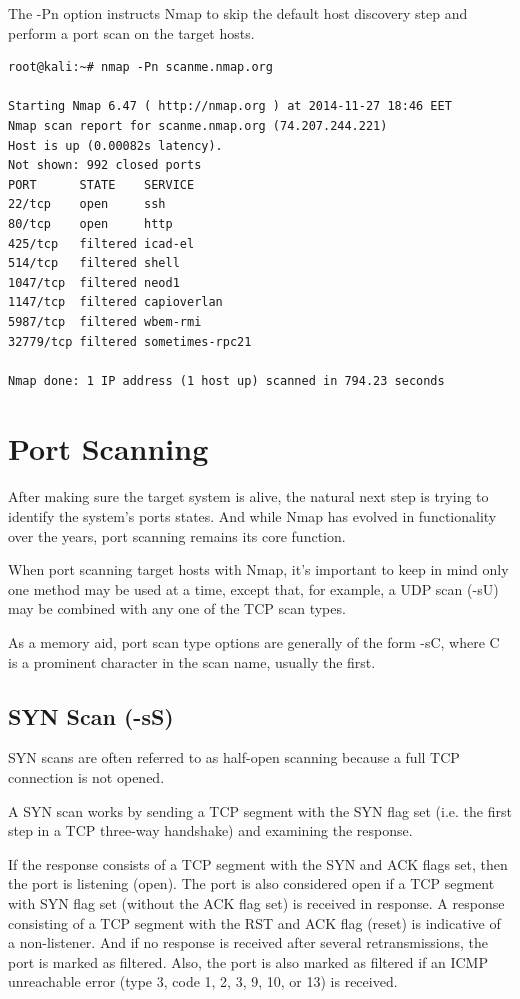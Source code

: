 \documentclass[a4paper,oneside,12pt]{book}
\begin{document}
The -Pn option instructs Nmap to skip the default host discovery step and perform a port scan on the target hosts.

\begin{lstlisting}[title=A sample Nmap scan using the No Ping option]
root@kali:~# nmap -Pn scanme.nmap.org

Starting Nmap 6.47 ( http://nmap.org ) at 2014-11-27 18:46 EET
Nmap scan report for scanme.nmap.org (74.207.244.221)
Host is up (0.00082s latency).
Not shown: 992 closed ports
PORT      STATE    SERVICE
22/tcp    open     ssh
80/tcp    open     http
425/tcp   filtered icad-el
514/tcp   filtered shell
1047/tcp  filtered neod1
1147/tcp  filtered capioverlan
5987/tcp  filtered wbem-rmi
32779/tcp filtered sometimes-rpc21

Nmap done: 1 IP address (1 host up) scanned in 794.23 seconds
\end{lstlisting}

\chapter{Port Scanning}

After making sure the target system is alive, the natural next step is trying to identify the system's ports states. And while Nmap has evolved in functionality over the years, port scanning remains its core function.

When port scanning target hosts with Nmap, it's important to keep in mind only one method may be used at a time, except that, for example, a UDP scan (-sU) may be combined with any one of the TCP scan types.

As a memory aid, port scan type options are generally of the form -sC, where C is a prominent character in the scan name, usually the first. 

\section{SYN Scan (-sS)}

SYN scans are often referred to as half-open scanning because a full TCP connection is not opened.

A SYN scan works by sending a TCP segment with the SYN flag set (i.e. the first step in a TCP three-way handshake) and examining the response.

If the response consists of a TCP segment with the SYN and ACK flags set, then the port is listening (open). The port is also considered open if a TCP segment with SYN flag set (without the ACK flag set) is received in response. A response consisting of a TCP segment with the RST and ACK flag (reset) is indicative of a non-listener. And if no response is received after several retransmissions, the port is marked as filtered. Also, the port is also marked as filtered if an ICMP unreachable error (type 3, code 1, 2, 3, 9, 10, or 13) is received.
\end{document}
